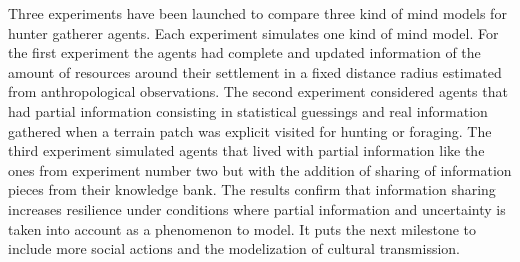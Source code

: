 \documentclass[11pt,oneside,a4paper,openright]{report}
\begin{document}
Three experiments have been launched to compare three kind of mind models for hunter gatherer agents. Each experiment simulates one kind of mind model. For the first experiment the agents had complete and updated information of the amount of resources around their settlement in a fixed distance radius estimated from anthropological observations. The second experiment considered agents that had partial information
consisting in statistical guessings and real information gathered when a terrain patch was explicit visited for hunting or foraging. The third experiment simulated agents that
lived with partial information like the ones from experiment number two but with the addition of sharing of information pieces from their knowledge bank.
The results confirm that information sharing increases resilience under conditions where partial information and uncertainty is taken into account as a phenomenon to model.
It puts the next milestone to include more social actions and the modelization of cultural transmission.



\end{document}
